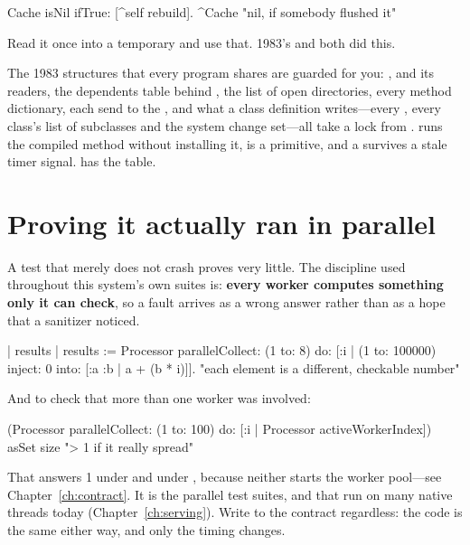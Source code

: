 \begin{stwarn}
\begin{st}
Cache isNil ifTrue: [^self rebuild].
^Cache                                   "nil, if somebody flushed it"
\end{st}
Read it once into a temporary and use that. 1983's  and
 both did this.
\end{stwarn}

\begin{stnote}
The 1983 structures that every program shares are guarded for you:
,  and its readers, the dependents
table behind , the list of open directories, every method
dictionary, each send to the , and what a class definition
writes---every , every class's list of subclasses and the
system change set---all take a lock from
. 
runs the compiled method without installing it,  is a
primitive, and a  survives a stale timer signal.
 has the table.
\end{stnote}

\section{Proving it actually ran in parallel}

A test that merely does not crash proves very little. The discipline used
throughout this system's own suites is: \textbf{every worker computes something
only it can check}, so a fault arrives as a wrong answer rather than as a hope
that a sanitizer noticed.

\begin{st}
| results |
results := Processor parallelCollect: (1 to: 8) do: [:i |
    (1 to: 100000) inject: 0 into: [:a :b | a + (b * i)]].
"each element is a different, checkable number"
\end{st}

And to check that more than one worker was involved:

\begin{st}
(Processor parallelCollect: (1 to: 100) do: [:i | Processor activeWorkerIndex])
    asSet size                            "> 1 if it really spread"
\end{st}

\begin{stwarn}
That answers 1 under  and under , because
neither starts the worker pool---see Chapter~\ref{ch:contract}. It is the
parallel test suites,  and  that run on many
native threads today (Chapter~\ref{ch:serving}). Write to the contract regardless: the code is the same either way, and
only the timing changes.
\end{stwarn}

